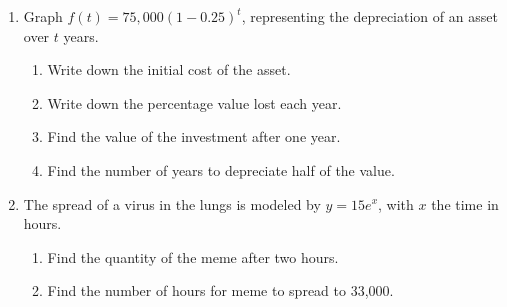 \documentclass[12pt, twoside]{article}
\begin{document}
\begin{enumerate}
\item Graph $\displaystyle f(t)=75,000 \left( 1-0.25 \right)^t$, representing the depreciation of an asset over $t$ years.
\begin{multicols}{2}
    \begin{enumerate}[itemsep=1.2cm]
        \item Write down the initial cost of the asset.
        \item Write down the percentage value lost each year.
        \item Find the value of the investment after one year.\vspace{1cm}
        \item Find the number of years to depreciate half of the value.
    \end{enumerate}
    \begin{center}
    \end{center}
    \end{multicols}

\newpage
\item The spread of a virus in the lungs is modeled by $\displaystyle y= 15 e^x$, with $x$ the time in hours. 
\begin{enumerate}[itemsep=1cm]
    \item Find the quantity of the meme after two hours.
    \item Find the number of hours for meme to spread to 33,000.
\end{enumerate} \vspace{2cm}


\end{enumerate}
\end{document}
